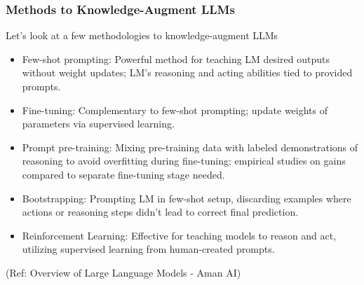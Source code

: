 \begin{frame}[fragile]\frametitle{Methods to Knowledge-Augment LLMs}

Let’s look at a few methodologies to knowledge-augment LLMs

\begin{itemize}
\item Few-shot prompting: Powerful method for teaching LM desired outputs without weight updates; LM's reasoning and acting abilities tied to provided prompts.
\item Fine-tuning: Complementary to few-shot prompting; update weights of parameters via supervised learning.
\item Prompt pre-training: Mixing pre-training data with labeled demonstrations of reasoning to avoid overfitting during fine-tuning; empirical studies on gains compared to separate fine-tuning stage needed.
\item Bootstrapping: Prompting LM in few-shot setup, discarding examples where actions or reasoning steps didn't lead to correct final prediction.
\item Reinforcement Learning: Effective for teaching models to reason and act, utilizing supervised learning from human-created prompts.
\end{itemize}

{\tiny (Ref: Overview of Large Language Models - Aman AI)}

\end{frame}

